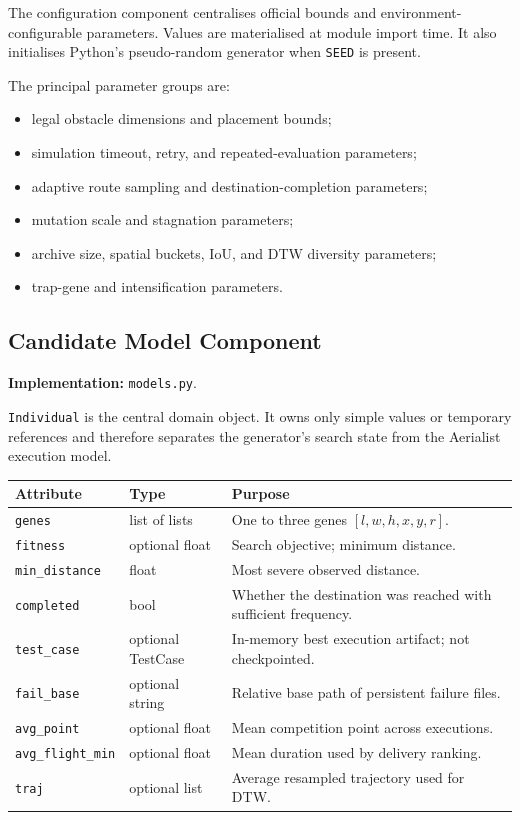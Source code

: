 \documentclass[11pt,a4paper,openany]{report}
\newcommand{\code}[1]{\texttt{#1}}
\begin{document}
The configuration component centralises official bounds and environment-configurable parameters. Values are materialised at module import time. It also initialises Python's pseudo-random generator when \code{SEED} is present.

The principal parameter groups are:
\begin{itemize}
  \item legal obstacle dimensions and placement bounds;
  \item simulation timeout, retry, and repeated-evaluation parameters;
  \item adaptive route sampling and destination-completion parameters;
  \item mutation scale and stagnation parameters;
  \item archive size, spatial buckets, IoU, and DTW diversity parameters;
  \item trap-gene and intensification parameters.
\end{itemize}

\subsection{Candidate Model Component}
\textbf{Implementation:} \code{models.py}.

\code{Individual} is the central domain object. It owns only simple values or temporary references and therefore separates the generator's search state from the Aerialist execution model.

\begin{table}[H]
\centering
\begin{tabularx}{\textwidth}{L{3.4cm} L{3.0cm} Y}
\toprule
\textbf{Attribute} & \textbf{Type} & \textbf{Purpose}\\
\midrule
\code{genes} & list of lists & One to three genes $[l,w,h,x,y,r]$.\\
\code{fitness} & optional float & Search objective; minimum distance.\\
\code{min\_distance} & float & Most severe observed distance.\\
\code{completed} & bool & Whether the destination was reached with sufficient frequency.\\
\code{test\_case} & optional TestCase & In-memory best execution artifact; not checkpointed.\\
\code{fail\_base} & optional string & Relative base path of persistent failure files.\\
\code{avg\_point} & optional float & Mean competition point across executions.\\
\code{avg\_flight\_min} & optional float & Mean duration used by delivery ranking.\\
\code{traj} & optional list & Average resampled trajectory used for DTW.\\
\bottomrule
\end{tabularx}
\end{table}
\end{document}
